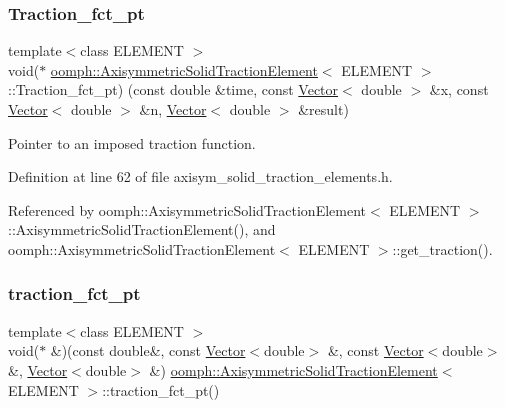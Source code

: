 \subsubsection{\texorpdfstring{Traction\+\_\+fct\+\_\+pt}{Traction\_fct\_pt}}
{\footnotesize\ttfamily template$<$class E\+L\+E\+M\+E\+NT $>$ \\
void($\ast$ \hyperlink{classoomph_1_1AxisymmetricSolidTractionElement}{oomph\+::\+Axisymmetric\+Solid\+Traction\+Element}$<$ E\+L\+E\+M\+E\+NT $>$\+::Traction\+\_\+fct\+\_\+pt) (const double \&time, const \hyperlink{classoomph_1_1Vector}{Vector}$<$ double $>$ \&x, const \hyperlink{classoomph_1_1Vector}{Vector}$<$ double $>$ \&n, \hyperlink{classoomph_1_1Vector}{Vector}$<$ double $>$ \&result)\hspace{0.3cm}{\ttfamily [private]}}



Pointer to an imposed traction function. 



Definition at line 62 of file axisym\+\_\+solid\+\_\+traction\+\_\+elements.\+h.



Referenced by oomph\+::\+Axisymmetric\+Solid\+Traction\+Element$<$ E\+L\+E\+M\+E\+N\+T $>$\+::\+Axisymmetric\+Solid\+Traction\+Element(), and oomph\+::\+Axisymmetric\+Solid\+Traction\+Element$<$ E\+L\+E\+M\+E\+N\+T $>$\+::get\+\_\+traction().

\mbox{\label{classoomph_1_1AxisymmetricSolidTractionElement_a437b43759687da0f3f49e0b13d1afe10}} 
\subsubsection{\texorpdfstring{traction\+\_\+fct\+\_\+pt}{traction\_fct\_pt}}
{\footnotesize\ttfamily template$<$class E\+L\+E\+M\+E\+NT $>$ \\
void($\ast$ \&)(const double\&, const \hyperlink{classoomph_1_1Vector}{Vector}$<$double$>$ \&, const \hyperlink{classoomph_1_1Vector}{Vector}$<$double$>$ \&, \hyperlink{classoomph_1_1Vector}{Vector}$<$double$>$ \&) \hyperlink{classoomph_1_1AxisymmetricSolidTractionElement}{oomph\+::\+Axisymmetric\+Solid\+Traction\+Element}$<$ E\+L\+E\+M\+E\+NT $>$\+::traction\+\_\+fct\+\_\+pt()\hspace{0.3cm}{\ttfamily [inline]}}



